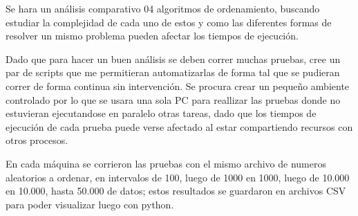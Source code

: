 \documentclass{article}
\begin{document}
	Se hara un análisis comparativo 04 algoritmos de ordenamiento, buscando estudiar la complejidad de cada uno de estos y como las diferentes formas de resolver un mismo problema pueden afectar los tiempos de ejecución.
	
	Dado que para hacer un buen análisis se deben correr muchas pruebas, cree un par de scripts que me permitieran automatizarlas de forma tal que se pudieran correr de forma continua sin intervención. Se procura crear un pequeño ambiente controlado por lo que se usara una sola PC para reallizar las pruebas donde no estuvieran ejecutandose en paralelo otras tareas, dado que los tiempos de ejecución de cada prueba puede verse afectado al estar compartiendo recursos con otros procesos.

    En cada máquina se corrieron las pruebas con el mismo archivo de numeros aleatorios a ordenar, en intervalos de 100, luego de 1000 en 1000, luego de 10.000 en 10.000, hasta 50.000 de datos; estos resultados se guardaron en archivos CSV para poder visualizar luego con python.
	

	
\end{document}
